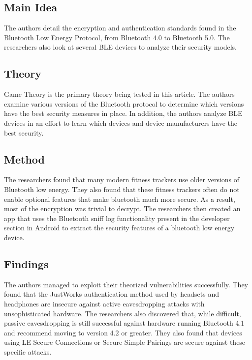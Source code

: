 \documentclass[letterpaper,12pt]{article}
\begin{document}
\subsection{Main Idea}

\noindent
The authors detail the encryption and authentication standards found in the Bluetooth Low Energy Protocol, from Bluetooth 4.0 to Bluetooth 5.0.  The researchers also look at several BLE devices to analyze their security models.

\subsection{Theory}

\noindent
Game Theory is the primary theory being tested in this article.  The authors examine various versions of the Bluetooth protocol to determine which versions have the best security measures in place.  In addition, the authors analyze BLE devices in an effort to learn which devices and device manufacturers have the best security.

\subsection{Method}

\noindent
The researchers found that many modern fitness trackers use older versions of Bluetooth low energy.  They also found that these fitness trackers often do not enable optional features that make bluetooth much more secure.  As a result, most of the encryption was trivial to decrypt.  The researchers then created an app that uses the Bluetooth sniff log functionality present in the developer section in Android to extract the security features of a bluetooth low energy device.

\subsection{Findings}

\noindent
The authors managed to exploit their theorized vulnerabilities successfully.  They found that the JustWorks authentication method used by headsets and headphones are insecure against active eavesdropping attacks with unsophisticated hardware.  The researchers also discovered that, while difficult, passive eavesdropping is still successful against hardware running Bluetooth 4.1 and recommend moving to version 4.2 or greater.  They also found that devices using LE Secure Connections or Secure Simple Pairings are secure against these specific attacks.
\end{document}
